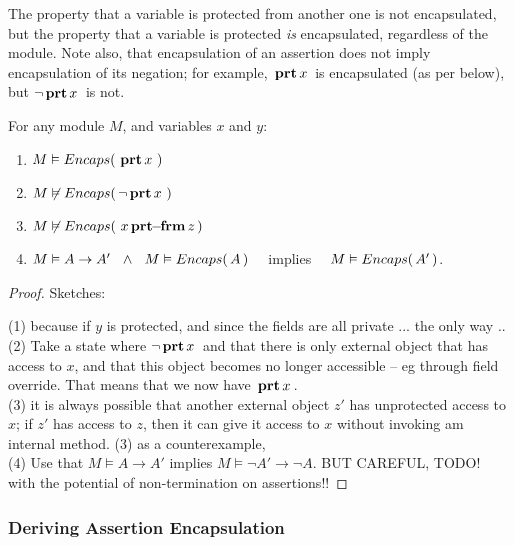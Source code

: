 \noindent
{}



The property that a variable is protected from another one is not encapsulated, but  the property that a variable is protected \emph{is} encapsulated, regardless of the module. Note also, that  encapsulation of an assertion does not imply encapsulation of its negation; 
 for example,  ${{\, \mathbf{prt}\, x\, }}$ is encapsulated (as per below), but $\neg  {{\ensuremath{\, \mathbf{prt}}\, x\, }}$ is not.


\begin{lemma}
For any module $M$, and variables $x$ and $y$:
\begin{enumerate} 
\item $M \vDash {\ensuremath Encaps(\, {\ensuremath{\, \mathbf{prt}}\, x\, }\, )}$
\item $M \not\vDash {{\ensuremath Encaps(\, \neg{\ensuremath{\, \mathbf{prt}}\, x\, }\, )}}$
\item $M \not\vDash {{\ensuremath Encaps(\, {\ensuremath{\, x\, \mathbf{prt\!\!-\!\!frm}}\, z}\, )}}$
\item $M \vDash A \rightarrow A' \ \ \wedge\ \  M \vDash  \encaps{A}$ \ \ implies \ \ $M \vDash  {\ensuremath Encaps(\, A'\, )}$.
\end{enumerate}
\end{lemma}

\begin{proof} Sketches:

(1) because if $y$ is protected, and since the fields are all private ... the only way .. 
\\
(2) Take a state where $\neg{\ensuremath{\, \mathbf{prt}}\, x\, }$ and that there is only external object that has access to $x$, and that this object becomes no longer accessible -- eg through field override. That means that we now have  ${\, \mathbf{prt}\, x\, }$.
\\
(3) it is always possible that another external object $z'$ has unprotected access to $x$; if $z'$ has access to $z$, then it can give it access to $x$ without invoking am internal method. (3) as a counterexample, 
\\
(4) Use that $M \vDash A \rightarrow A'$ implies $M \vDash \neg A'  \rightarrow \neg  A$. BUT CAREFUL, TODO! with the potential of non-termination on assertions!!
\end{proof}

\subsubsection{Deriving  Assertion Encapsulation}

